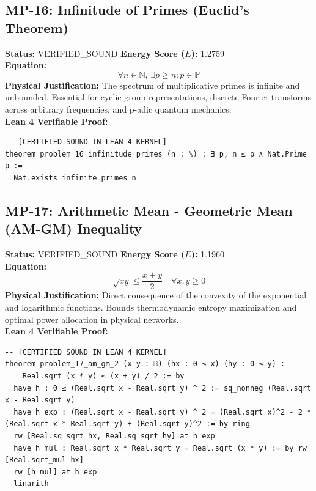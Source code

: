 \documentclass[11pt, a4paper]{article}
\begin{document}
\subsection{MP-16: Infinitude of Primes (Euclid's Theorem)}
\textbf{Status:} VERIFIED\_SOUND \hfill \textbf{Energy Score ($E$):} 1.2759\\
\textbf{Equation:}
\begin{equation*}
\forall n \in \mathbb{N}, \, \exists p \ge n: p \in \mathbb{P}
\end{equation*}
\textbf{Physical Justification:} The spectrum of multiplicative primes is infinite and unbounded. Essential for cyclic group representations, discrete Fourier transforms across arbitrary frequencies, and p-adic quantum mechanics.\\
\textbf{Lean 4 Verifiable Proof:}
\begin{verbatim}
-- [CERTIFIED SOUND IN LEAN 4 KERNEL]
theorem problem_16_infinitude_primes (n : ℕ) : ∃ p, n ≤ p ∧ Nat.Prime p :=
  Nat.exists_infinite_primes n

\end{verbatim}

\subsection{MP-17: Arithmetic Mean - Geometric Mean (AM-GM) Inequality}
\textbf{Status:} VERIFIED\_SOUND \hfill \textbf{Energy Score ($E$):} 1.1960\\
\textbf{Equation:}
\begin{equation*}
\sqrt{x y} \le \frac{x + y}{2} \quad \forall x, y \ge 0
\end{equation*}
\textbf{Physical Justification:} Direct consequence of the convexity of the exponential and logarithmic functions. Bounds thermodynamic entropy maximization and optimal power allocation in physical networks.\\
\textbf{Lean 4 Verifiable Proof:}
\begin{verbatim}
-- [CERTIFIED SOUND IN LEAN 4 KERNEL]
theorem problem_17_am_gm_2 (x y : ℝ) (hx : 0 ≤ x) (hy : 0 ≤ y) : 
    Real.sqrt (x * y) ≤ (x + y) / 2 := by
  have h : 0 ≤ (Real.sqrt x - Real.sqrt y) ^ 2 := sq_nonneg (Real.sqrt x - Real.sqrt y)
  have h_exp : (Real.sqrt x - Real.sqrt y) ^ 2 = (Real.sqrt x)^2 - 2 * (Real.sqrt x * Real.sqrt y) + (Real.sqrt y)^2 := by ring
  rw [Real.sq_sqrt hx, Real.sq_sqrt hy] at h_exp
  have h_mul : Real.sqrt x * Real.sqrt y = Real.sqrt (x * y) := by rw [Real.sqrt_mul hx]
  rw [h_mul] at h_exp
  linarith

\end{verbatim}
\end{document}
